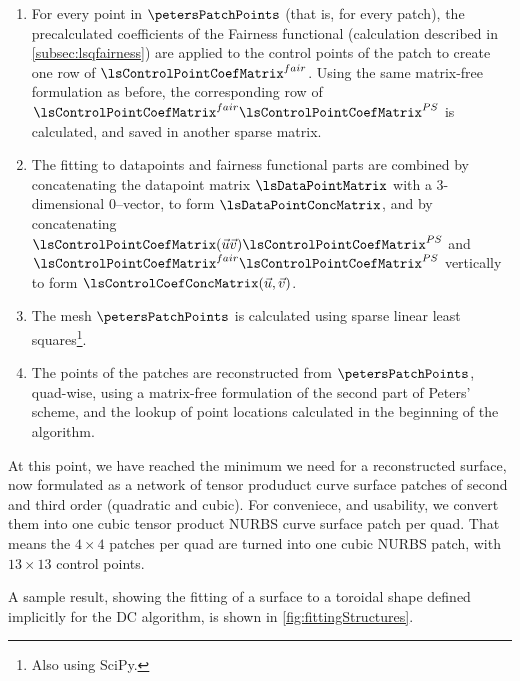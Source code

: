 \begin{enumerate}
\begin{enumerate}[label=(\alph*)]
\end{enumerate}
\item For every point in $\petersPatchPoints$ (that is, for every \Bez patch), the precalculated coefficients of the Fairness functional (calculation described in \autoref{subsec:lsqfairness}) are applied to the \Bez control points of the patch to create one row of $\lsControlPointCoefMatrix^{fair}$. Using the same matrix-free formulation as before, the corresponding row of $\lsControlPointCoefMatrix^{fair}\lsControlPointCoefMatrix^{PS}$ is calculated, and saved in another sparse matrix.
\item The fitting to datapoints and fairness functional parts are combined by concatenating the datapoint matrix $\lsDataPointMatrix$ with a 3-dimensional $0$--vector, to form $\lsDataPointConcMatrix$, and by concatenating $\lsControlPointCoefMatrix(\vec{u}\vec{v})\lsControlPointCoefMatrix^{PS}$ and  $\lsControlPointCoefMatrix^{fair}\lsControlPointCoefMatrix^{PS}$ vertically to form $\lsControlCoefConcMatrix(\vec{u},\vec{v})$.
\item The mesh $\petersPatchPoints$ is calculated using sparse linear least squares\footnote{Also using SciPy.}.
\item The \Bez points of the patches are reconstructed from $\petersPatchPoints$, quad-wise, using a matrix-free formulation of the second part of Peters' scheme, and the lookup of point locations calculated in the beginning of the algorithm.
\end{enumerate}
At this point, we have reached the minimum we need for a reconstructed surface, now formulated as a network of tensor produduct \Bez curve surface patches of second and third order (quadratic and cubic). For conveniece, and usability, we convert them into one cubic tensor product NURBS curve surface patch per quad. That means the $4\times4$ \Bez patches per quad are turned into one cubic NURBS patch, with $13\times13$ control points. 

A sample result, showing the fitting of a surface to a toroidal shape defined implicitly for the \acs{DC} algorithm, is shown in \autoref{fig:fittingStructures}. 

